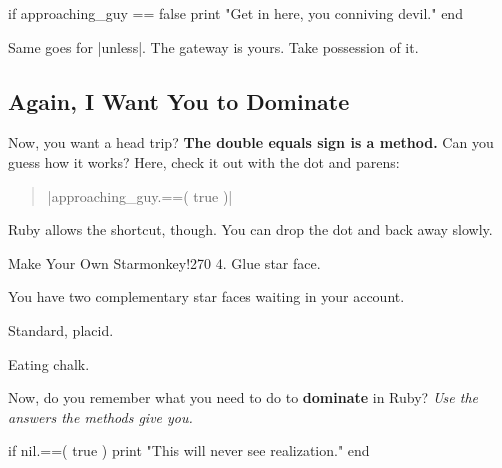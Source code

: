 \documentclass[12pt,twoside]{report}
\begin{document}
\begin{rubycode}

 if approaching_guy == false 
   print "Get in here, you conniving devil."
 end

\end{rubycode}


Same goes for \rubyinline|unless|.  The gateway is
yours.  Take possession of it.



\subsection{Again, I Want You to Dominate}



Now, you want a head trip?  {\bf The double equals sign is a method.}
Can you guess how it works?  Here, check it out with the dot and
parens:

\begin{quote}
\rubyinline|approaching_guy.==( true )|\end{quote}


Ruby allows the shortcut, though.  You can drop the dot and back away
slowly.

\pagebreak


	\begin{sidebar}{Make Your Own Starmonkey!}{270}
		\vspace{6pt}
		4. Glue star face.

		\vspace{6pt}		
		\vspace{12pt}
		
		You have two complementary star faces waiting in your account.

		\vspace{6pt}		
		
		\begin{center}
			Standard, placid.
		\end{center}
		
		
		\begin{center}
			Eating chalk.
		\end{center}
	\end{sidebar}

Now, do you remember what you need to do to {\bf dominate} in Ruby?
{\em Use the answers the methods give you.}


\begin{rubycode}

 if nil.==( true )
   print "This will never see realization."  
 end

\end{rubycode}
\end{document}
